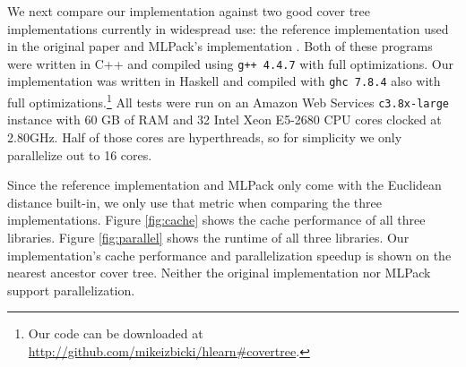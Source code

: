 \documentclass[thesis.tex]{subfiles}
\begin{document}
We next compare our implementation against two good cover tree implementations currently in widespread use:
the reference implementation used in the original paper \cite{beygelzimer2006cover}
and MLPack's implementation \cite{curtin2013mlpack}.
Both of these programs were written in C++ and compiled using \texttt{g++ 4.4.7} with full optimizations.
Our implementation was written in Haskell and compiled with \texttt{ghc 7.8.4} also with full optimizations.\footnote{Our code can be downloaded at \url{http://github.com/mikeizbicki/hlearn\#covertree}.}
All tests were run on an Amazon Web Services \texttt{c3.8x-large} instance with 60 GB of RAM and 32 Intel Xeon E5-2680 CPU cores clocked at 2.80GHz.
Half of those cores are hyperthreads, so for simplicity we only parallelize out to 16 cores.

Since the reference implementation and MLPack only come with the Euclidean distance built-in, we only use that metric when comparing the three implementations.
Figure \ref{fig:cache} shows the cache performance of all three libraries.
Figure \ref{fig:parallel} shows the runtime of all three libraries.
Our implementation's cache performance and parallelization speedup is shown on the nearest ancestor cover tree.
Neither the original implementation nor MLPack support parallelization.

\end{document}
